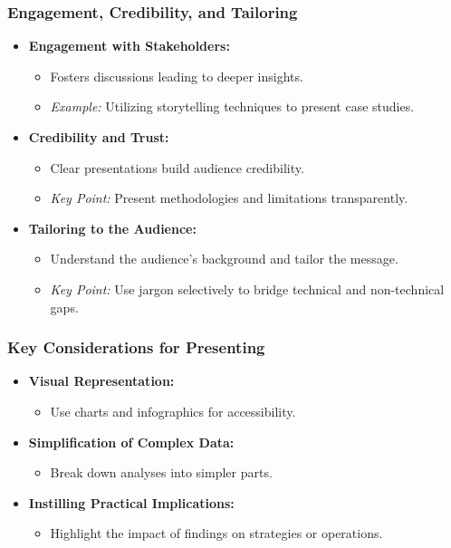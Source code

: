 \documentclass{beamer}
\begin{document}
\begin{frame}[fragile]
    \frametitle{Engagement, Credibility, and Tailoring}
    \begin{itemize}
        \item \textbf{Engagement with Stakeholders:}
        \begin{itemize}
            \item Fosters discussions leading to deeper insights.
            \item \textit{Example:} Utilizing storytelling techniques to present case studies.
        \end{itemize}
        
        \item \textbf{Credibility and Trust:}
        \begin{itemize}
            \item Clear presentations build audience credibility.
            \item \textit{Key Point:} Present methodologies and limitations transparently.
        \end{itemize}

        \item \textbf{Tailoring to the Audience:}
        \begin{itemize}
            \item Understand the audience's background and tailor the message.
            \item \textit{Key Point:} Use jargon selectively to bridge technical and non-technical gaps.
        \end{itemize}
    \end{itemize}
\end{frame}

\begin{frame}[fragile]
    \frametitle{Key Considerations for Presenting}
    \begin{itemize}
        \item \textbf{Visual Representation:} 
        \begin{itemize}
            \item Use charts and infographics for accessibility.
        \end{itemize}
        
        \item \textbf{Simplification of Complex Data:}
        \begin{itemize}
            \item Break down analyses into simpler parts.
        \end{itemize}
        
        \item \textbf{Instilling Practical Implications:}
        \begin{itemize}
            \item Highlight the impact of findings on strategies or operations.
        \end{itemize}
    \end{itemize}
\end{frame}
\end{document}

